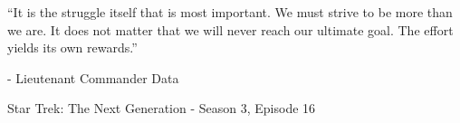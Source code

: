 \begin{dedication}
{\centering\huge
``It is the struggle itself that is most important.
We must strive to be more than we are.
It does not matter that we will never reach our ultimate goal.
The effort yields its own rewards.''
\par}

\begin{flushright}
- Lieutenant Commander Data

Star Trek: The Next Generation - Season 3, Episode 16
\end{flushright}
\end{dedication}
